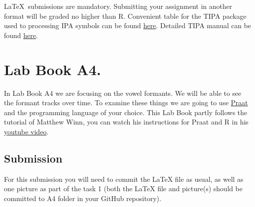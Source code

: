 \documentclass{../labbook}
\begin{document}
\begin{mdframed}[backgroundcolor=blue!20]
\LaTeX~submissions are mandatory. Submitting your assignment in another format will be graded no higher than R. Convenient table for the TIPA package used to processing IPA symbols can be found \href{https://jon.dehdari.org/tutorials/tipachart_mod.pdf}{here}. Detailed TIPA manual can be found \href{http://www.l.u-tokyo.ac.jp/~fkr/tipa/tipaman.pdf}{here}.
\end{mdframed}

\tableofcontents %

\section{Lab Book A4.}
In Lab Book A4 we are focusing on the vowel formants. We will be able to see the formant tracks over time. To examine these things we are going to use \href{https://www.fon.hum.uva.nl/praat/}{Praat} and the programming language of your choice.
This Lab Book partly follows the tutorial of Matthew Winn, you can watch his instructions for Praat and R in his \href{https://youtu.be/BGW8J4cG0qY}{youtube video}.

\subsection{Submission}
For this submission you will need to commit the {\LaTeX} file as usual, as well as one picture as part of the task 1 (both the LaTeX file and picture(s) should be committed to A4 folder in your GitHub repository). 
\end{document}
